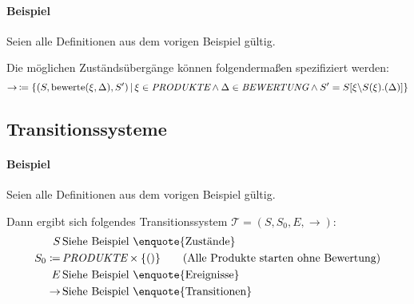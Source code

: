 			\paragraph{Beispiel}
				Seien alle Definitionen aus dem vorigen Beispiel gültig.

				Die möglichen Zuständsübergänge können folgendermaßen spezifiziert werden:
				\begin{equation*}
					\rightarrow\, \coloneqq \{ (S, \text{bewerte}(\xi, \Delta), S') \,\vert\, \xi \in \textit{PRODUKTE} \land \Delta \in \textit{BEWERTUNG} \land S' = S[\xi \backslash S(\xi).(\Delta)] \}
				\end{equation*}

		\subsection{Transitionssysteme}


			\paragraph{Beispiel}
				Seien alle Definitionen aus dem vorigen Beispiel gültig.

				Dann ergibt sich folgendes Transitionssystem $ \mathcal{T} = (S, S _ 0, E, \rightarrow) $:
				\begin{align*}
					S               & \, \text{Siehe Beispiel \enquote{Zustände}}                                     \\
					S _ 0 \coloneqq & \, \textit{PRODUKTE} \times \{ () \} \tag{Alle Produkte starten ohne Bewertung} \\
					E               & \, \text{Siehe Beispiel \enquote{Ereignisse}}                                   \\
					\rightarrow     & \, \text{Siehe Beispiel \enquote{Transitionen}}                                 \\
				\end{align*}

